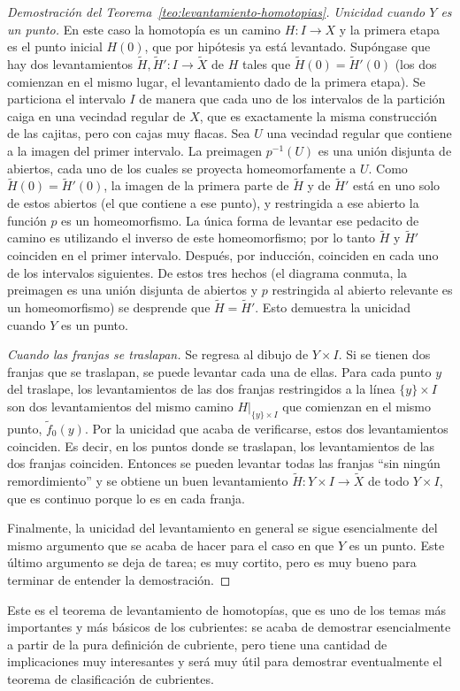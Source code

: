 \documentclass[11pt]{article}
\begin{document}
\begin{proof}[Demostración del Teorema~\ref{teo:levantamiento-homotopias}]
\emph{Unicidad cuando $Y$ es un punto.} En este caso la homotopía es un camino $H\colon I\to X$ y la primera etapa es el punto inicial $H(0)$, que por hipótesis ya está levantado. Supóngase que hay dos levantamientos $\tilde H,\tilde H'\colon I\to\tilde X$ de $H$ tales que $\tilde H(0)=\tilde H'(0)$ (los dos comienzan en el mismo lugar, el levantamiento dado de la primera etapa). Se particiona el intervalo $I$ de manera que cada uno de los intervalos de la partición caiga en una vecindad regular de $X$, que es exactamente la misma construcción de las cajitas, pero con cajas muy flacas. Sea $U$ una vecindad regular que contiene a la imagen del primer intervalo. La preimagen $p^{-1}(U)$ es una unión disjunta de abiertos, cada uno de los cuales se proyecta homeomorfamente a $U$. Como $\tilde H(0)=\tilde H'(0)$, la imagen de la primera parte de $\tilde H$ y de $\tilde H'$ está en uno solo de estos abiertos (el que contiene a ese punto), y restringida a ese abierto la función $p$ es un homeomorfismo. La única forma de levantar ese pedacito de camino es utilizando el inverso de este homeomorfismo; por lo tanto $\tilde H$ y $\tilde H'$ coinciden en el primer intervalo. Después, por inducción, coinciden en cada uno de los intervalos siguientes. De estos tres hechos (el diagrama conmuta, la preimagen es una unión disjunta de abiertos y $p$ restringida al abierto relevante es un homeomorfismo) se desprende que $\tilde H=\tilde H'$. Esto demuestra la unicidad cuando $Y$ es un punto.

\emph{Cuando las franjas se traslapan.} Se regresa al dibujo de $Y\times I$. Si se tienen dos franjas que se traslapan, se puede levantar cada una de ellas. Para cada punto $y$ del traslape, los levantamientos de las dos franjas restringidos a la línea $\{y\}\times I$ son dos levantamientos del mismo camino $H|_{\{y\}\times I}$ que comienzan en el mismo punto, $\tilde f_0(y)$. Por la unicidad que acaba de verificarse, estos dos levantamientos coinciden. Es decir, en los puntos donde se traslapan, los levantamientos de las dos franjas coinciden. Entonces se pueden levantar todas las franjas ``sin ningún remordimiento'' y se obtiene un buen levantamiento $\tilde H\colon Y\times I\to\tilde X$ de todo $Y\times I$, que es continuo porque lo es en cada franja.

Finalmente, la unicidad del levantamiento en general se sigue esencialmente del mismo argumento que se acaba de hacer para el caso en que $Y$ es un punto. Este último argumento se deja de tarea; es muy cortito, pero es muy bueno para terminar de entender la demostración.
\end{proof}

Este es el teorema de levantamiento de homotopías, que es uno de los temas más importantes y más básicos de los cubrientes: se acaba de demostrar esencialmente a partir de la pura definición de cubriente, pero tiene una cantidad de implicaciones muy interesantes y será muy útil para demostrar eventualmente el teorema de clasificación de cubrientes.
\end{document}
